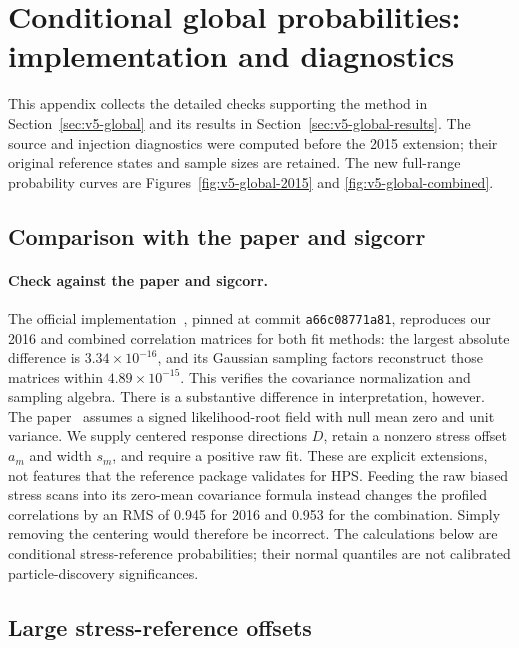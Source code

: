 \section{Conditional global probabilities: implementation and diagnostics}
\label{app:v504-global-study}
This appendix collects the detailed checks supporting the method in
Section~\ref{sec:v5-global} and its results in
Section~\ref{sec:v5-global-results}. The source and injection diagnostics
were computed before the 2015 extension; their original reference states
and sample sizes are retained. The new full-range probability curves are
Figures~\ref{fig:v5-global-2015} and \ref{fig:v5-global-combined}.
\subsection{Comparison with the paper and sigcorr}
\paragraph{Check against the paper and sigcorr.}
The official implementation~\cite{SigcorrPinned2023}, pinned at commit
\texttt{a66c08771a81}, reproduces our 2016 and combined correlation matrices
for both fit methods: the largest absolute difference is
$3.34\times10^{-16}$, and its Gaussian sampling factors reconstruct those
matrices within $4.89\times10^{-15}$. This verifies the covariance
normalization and sampling algebra. There is a substantive difference in
interpretation, however. The paper~\cite{AnanievRead2023} assumes a signed
likelihood-root field with null mean zero and unit variance. We supply
centered response directions $D$, retain a nonzero stress offset $a_m$ and
width $s_m$, and require a positive raw fit. These are explicit extensions,
not features that the reference package validates for HPS. Feeding the raw
biased stress scans into its zero-mean covariance formula instead changes
the profiled correlations by an RMS of 0.945 for 2016 and 0.953 for the
combination. Simply removing the centering would therefore be incorrect.
The calculations below are conditional stress-reference probabilities;
their normal quantiles are not calibrated particle-discovery significances.

\subsection{Large stress-reference offsets}
